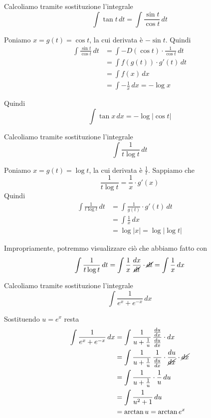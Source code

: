 \begin{example}
Calcoliamo tramite sostituzione l'integrale
\begin{equation*}
\int \tan t \, dt = \int \frac{\sin t}{\cos t} \, dt
\end{equation*}

Poniamo $x = g(t) = \cos t$, la cui derivata è $-\sin t$. Quindi
\begin{align*}
\int \frac{\sin t}{\cos t} \, dt &= \int -D(\cos t) \cdot \frac{1}{\cos t} \, dt \\
&= \int f(g(t)) \cdot g'(t) \, dt \\
&= \int f(x) \, dx \\
&= \int -\frac{1}{x} \, dx = -\log x
\end{align*}

Quindi
\begin{equation*}
\int \tan x \, dx = - \log|\cos t|
\end{equation*}
\end{example}

\begin{example}
Calcoliamo tramite sostituzione l'integrale
\begin{equation*}
\int \frac{1}{t\log t} \, dt
\end{equation*}

Poniamo $x = g(t) = \log t$, la cui derivata è $\frac{1}{t}$. Sappiamo che
\begin{equation*}
\frac{1}{t \log t} = \frac{1}{x} \cdot g'(x)
\end{equation*}
Quindi
\begin{align*}
\int \frac{1}{t\log t} \, dt &= \int \frac{1}{g(t)} \cdot g'(t) \, dt \\
&= \int \frac{1}{x} \, dx \\
&= \log |x| = \log |\log t|
\end{align*}

Impropriamente, potremmo visualizzare ciò che abbiamo fatto con
\begin{equation*}
\int \frac{1}{t\log t} \, dt = \int \frac{1}{x} \, \frac{dx}{\cancel{dt}} \cdot \cancel{dt} = \int \frac{1}{x} \, dx
\end{equation*}
\end{example}

\begin{example}
Calcoliamo tramite sostituzione l'integrale
\begin{equation*}
\int \frac{1}{e^x + e^{-x}} \, dx
\end{equation*}

Sostituendo $u = e^x$ resta
\begin{align*}
\int \frac{1}{e^x + e^{-x}} \, dx &= \int \frac{1}{u+\frac{1}{u}} \, \frac{\frac{du}{dx}}{\frac{du}{dx}} \cdot dx \\
&= \int \frac{1}{u+\frac{1}{u}} \, \frac{1}{\frac{du}{dx}} \cdot \frac{du}{\cancel{dx}} \cdot \cancel{dx} \\
&= \int \frac{1}{u+\frac{1}{u}} \cdot \frac{1}{u} \, du \\
&= \int \frac{1}{u^2 + 1} \, du \\
&= \arctan u = \arctan e^x
\end{align*}
\end{example}


